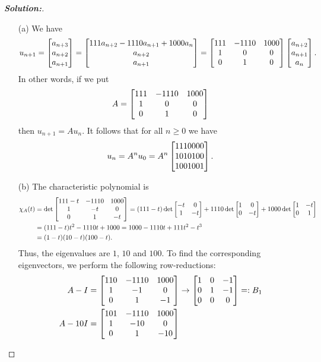 \documentclass[a4paper]{amsart}
\theoremstyle{definition}
\newenvironment{solution}{\begin{proof}[\textbf{Solution:}] \vphantom{u}}{\end{proof}}
\begin{document}
\begin{solution}
 \begin{itemize}
  \item[(a)] We have
   \[ u_{n+1} = 
      \left[\begin{matrix} a_{n+3} \\ a_{n+2} \\ a_{n+1} \end{matrix}\right] = 
      \left[\begin{matrix} 111 a_{n+2} - 1110 a_{n+1} + 1000 a_n \\ a_{n+2} \\ a_{n+1} \end{matrix}\right] = 
      \left[\begin{matrix} 111 & -1110 & 1000 \\ 1 & 0 & 0 \\ 0 & 1 & 0 \end{matrix}\right] 
       \left[\begin{matrix} a_{n+2} \\ a_{n+1} \\ a_n \end{matrix}\right].
   \]
   In other words, if we put 
   \[ A = \left[\begin{matrix} 111 & -1110 & 1000 \\ 1 & 0 & 0 \\ 0 & 1 & 0 \end{matrix}\right]  \]
   then $u_{n+1}=Au_n$.  It follows that for all $n\geq 0$ we have
   \[ u_n = A^nu_0 = A^n\left[\begin{matrix} 1110000 \\ 1010100 \\ 1001001\end{matrix}\right]. \]
  \item[(b)] The characteristic polynomial is 
   \begin{align*}
    \chi_A(t)
     &= \det\left[\begin{matrix} 111-t & -1110 & 1000 \\ 1 & -t & 0 \\ 0 & 1 & -t \end{matrix}\right]
      = (111-t) \det\left[\begin{matrix} -t & 0 \\ 1 & -t \end{matrix}\right] 
        +1110 \det\left[\begin{matrix} 1 & 0 \\ 0 & -t \end{matrix}\right] 
        +1000 \det\left[\begin{matrix} 1 & -t \\ 0 & 1\end{matrix}\right] \\
     &= (111-t)t^2 -1110t + 1000 
      = 1000 - 1110t + 111t^2 - t^3 \\
     &= (1-t)(10-t)(100-t).
   \end{align*}
   Thus, the eigenvalues are $1$, $10$ and $100$.  To find the
   corresponding eigenvectors, we perform the following
   row-reductions:
   \begin{align*}
    A-I    &= \bbm 110 & -1110 & 1000 \\ 1 & -1 & 0 \\ 0 & 1 & -1 \ebm 
            \to \bbm 1 & 0 & -1 \\ 0 & 1 & -1 \\ 0 & 0 & 0 \ebm =: B_1 \\
    A-10I  &= \bbm 101 & -1110 & 1000 \\ 1 & -10 & 0 \\ 0 & 1 & -10 \ebm 

\end{align*}
\end{itemize}
\end{solution}
\end{document}
